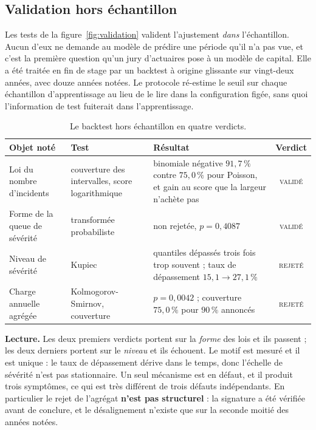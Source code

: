 \documentclass[12pt,a4paper]{article}
\theoremstyle{definition}
\newcommand{\vok}{\textsc{validé}}
\newcommand{\vrej}{\textsc{rejeté}}
\begin{document}
\subsection{Validation hors échantillon}
\label{ss:backtest}

Les tests de la figure~\ref{fig:validation} valident l'ajustement \emph{dans}
l'échantillon. Aucun d'eux ne demande au modèle de prédire une période qu'il n'a
pas vue, et c'est la première question qu'un jury d'actuaires pose à un modèle de
capital. Elle a été traitée en fin de stage par un backtest à origine glissante
sur vingt-deux années, avec douze années notées. Le protocole ré-estime le seuil
sur chaque échantillon d'apprentissage au lieu de le lire dans la configuration
figée, sans quoi l'information de test fuiterait dans l'apprentissage.

\begin{table}[htbp]
\centering\small
\renewcommand{\arraystretch}{1.2}
\begin{tabular}{@{}>{\raggedright\arraybackslash}p{3.1cm}>{\raggedright\arraybackslash}p{3.3cm}>{\raggedright\arraybackslash}p{5.6cm}c@{}}
\toprule
\textbf{Objet noté} & \textbf{Test} & \textbf{Résultat} & \textbf{Verdict} \\
\midrule
Loi du nombre d'incidents &
couverture des intervalles, score logarithmique &
binomiale négative $91{,}7\,\%$ contre $75{,}0\,\%$ pour Poisson, et gain au
score que la largeur n'achète pas &
\vok \\
Forme de la queue de sévérité &
transformée probabiliste &
non rejetée, $p = 0{,}4087$ &
\vok \\
Niveau de sévérité &
Kupiec &
quantiles dépassés trois fois trop souvent ; taux de dépassement
$15{,}1 \to 27{,}1\,\%$ &
\vrej \\
Charge annuelle agrégée &
Kolmogorov-Smirnov, couverture &
$p = 0{,}0042$ ; couverture $75{,}0\,\%$ pour $90\,\%$ annoncés &
\vrej \\
\bottomrule
\end{tabular}
\caption{Le backtest hors échantillon en quatre verdicts.}
\label{tab:backtest}
\end{table}

\textbf{Lecture.} Les deux premiers verdicts portent sur la \emph{forme} des lois
et ils passent ; les deux derniers portent sur le \emph{niveau} et ils échouent.
Le motif est mesuré et il est unique : le taux de dépassement dérive dans le
temps, donc l'échelle de sévérité n'est pas stationnaire. Un seul mécanisme est
en défaut, et il produit trois symptômes, ce qui est très différent de trois
défauts indépendants. En particulier le rejet de l'agrégat \textbf{n'est pas
structurel} : la signature a été vérifiée avant de conclure, et le désalignement
n'existe que sur la seconde moitié des années notées.
\end{document}
